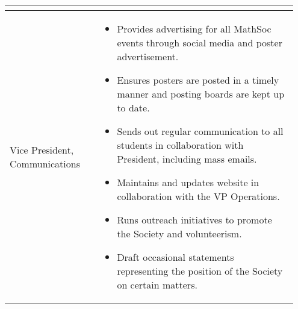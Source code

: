 \begin{longtable}{p{0.3\linewidth} p{0.65\linewidth}}
\begin{itemize}
\end{itemize}
\\
\midrule
Vice President, Communications &
\begin{itemize}
\item Provides advertising for all MathSoc events through social media and poster advertisement.
\item Ensures posters are posted in a timely manner and posting boards are kept up to date.
\item Sends out regular communication to all students in collaboration with President, including mass emails.
\item Maintains and updates website in collaboration with the VP Operations.
\item Runs outreach initiatives to promote the Society and volunteerism.
\item Draft occasional statements representing the position of the Society on certain matters.
\end{itemize}
\\
\bottomrule
\end{longtable}
